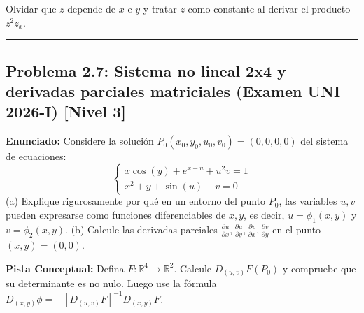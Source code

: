 \documentclass[11pt,a4paper]{article}
\begin{document}
\begin{trapbox}
Olvidar que $z$ depende de $x$ e $y$ y tratar $z$ como constante al derivar el producto $z^2 z_x$.
\end{trapbox}

\vspace{0.5cm}
\hrule
\vspace{0.5cm}

\subsection*{Problema 2.7: Sistema no lineal 2x4 y derivadas parciales matriciales (Examen UNI 2026-I) \hfill \color{primaryblue}\small[Nivel 3]}

\begin{tcolorbox}[colback=white,colframe=gray!40,arc=1mm,boxrule=0.5pt,left=3mm,right=3mm,top=2mm,bottom=2mm]
\textbf{Enunciado:} Considere la solución $P_0(x_0, y_0, u_0, v_0) = (0, 0, 0, 0)$ del sistema de ecuaciones:
\begin{equation*}
\begin{cases} x\cos(y) + e^{x-u} + u^2 v = 1 \\ x^2 + y + \sin(u) - v = 0 \end{cases}
\end{equation*}
(a) Explique rigurosamente por qué en un entorno del punto $P_0$, las variables $u, v$ pueden expresarse como funciones diferenciables de $x, y$, es decir, $u = \phi_1(x,y)$ y $v = \phi_2(x,y)$.
(b) Calcule las derivadas parciales $\frac{\partial u}{\partial x}, \frac{\partial u}{\partial y}, \frac{\partial v}{\partial x}, \frac{\partial v}{\partial y}$ en el punto $(x,y) = (0,0)$.
\end{tcolorbox}

\begin{tcolorbox}[colback=yellow!4,colframe=accentamber!70,arc=1mm,boxrule=0.5pt,left=3mm,right=3mm,top=1.5mm,bottom=1.5mm]
\textbf{Pista Conceptual:} Defina $F: \mathbb{R}^4 \to \mathbb{R}^2$. Calcule $D_{(u,v)}F(P_0)$ y compruebe que su determinante es no nulo. Luego use la fórmula $D_{(x,y)}\phi = -[D_{(u,v)}F]^{-1} D_{(x,y)}F$.
\end{tcolorbox}
\end{document}
